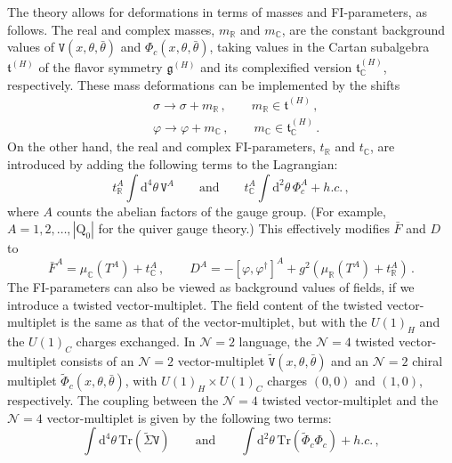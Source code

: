\documentclass[12pt,a4paper]{article}
\renewcommand{\(}{\left(}
\renewcommand{\)}{\right)}
\renewcommand{\(}{\left(}
\renewcommand{\)}{\right)}
\begin{document}
The theory allows for deformations in terms of masses and FI-parameters, as follows. 
The real and complex masses, $m_{\mathbb{R}}$ and $m_{\mathbb{C}}$, are the constant background values of $\mathtt{V}(x,\theta,\bar{\theta})$ and $\mathtt{\Phi}_c(x,\theta,\bar{\theta})$, taking values in the Cartan subalgebra $\mathfrak{t}^{(H)}$ of the flavor symmetry $\mathfrak{g}^{(H)}$ and its complexified version $\mathfrak{t}^{(H)}_{\mathbb{C}}$, respectively. 
These mass deformations can be implemented by the shifts 
\begin{equation}
\begin{aligned}
&\sigma\to\sigma+m_{\mathbb{R}}
\,,\qquad m_{\mathbb{R}}\in \mathfrak{t}^{(H)}\,,\\
&\varphi\to\varphi+m_{\mathbb{C}}\,,\qquad m_{\mathbb{C}}\in \mathfrak{t}^{(H)}_{\mathbb{C}}\,.
\end{aligned}
\end{equation}
On the other hand, the real and complex FI-parameters, $t_{\mathbb{R}}$ and $t_{\mathbb{C}}$, are introduced by adding the following terms to the Lagrangian:
\begin{equation}\label{eq:FI_para}
t^A_{\mathbb{R}}\int\mathrm{d}^4 \theta \, \mathtt{V}^A
\qquad \text{and}\qquad t^A_{\mathbb{C}}\int\mathrm{d}^2\theta \, \mathtt{\Phi}_c^A+h.c.\,,
\end{equation}
where $A$ counts the abelian factors of the gauge group. (For example, $A=1,2,\dots,|\mathrm{Q}_0|$ for the quiver gauge theory.) 
This effectively modifies $\bar{F}$ and $D$ to
\begin{equation}
\bar{F}^A= \mu_{\mathbb{C}}(T^A)+t^A_{\mathbb{C}}\,, \qquad
D^A= -[\varphi,\varphi^\dag]^A+g^2(\mu_{\mathbb{R}}(T^A)+t^A_{\mathbb{R}})\,.
\end{equation}
The FI-parameters can also be viewed as background values of fields, if we introduce a twisted vector-multiplet. 
The field content of the twisted vector-multiplet is the same as that of the vector-multiplet, but with the $U(1)_H$ and the $U(1)_C$ charges exchanged. 
In $\mathcal{N}=2$ language, the $\mathcal{N}=4$  twisted vector-multiplet consists of an $\mathcal{N}=2$ 
vector-multiplet $\tilde{\mathtt{V}}(x,\theta,\bar{\theta})$ and an $\mathcal{N}=2$ chiral multiplet $\tilde{\mathtt{\Phi}}_c(x,\theta,\bar{\theta})$, with $U(1)_H\times U(1)_C$ charges $(0,0)$ and $(1,0)$, respectively. 
The coupling between the  $\mathcal{N}=4$ twisted vector-multiplet and the $\mathcal{N}=4$ vector-multiplet is given by the following two terms:
\begin{equation}\label{eq:coupleTV-V}
\int \mathrm{d}^4\theta \,\mathrm{Tr}(\tilde{\mathtt{\Sigma}}\mathtt{V})
\qquad \text{and}\qquad 
\int \mathrm{d}^2\theta \, \mathrm{Tr}(\tilde{\mathtt{\Phi}}_c\mathtt{\Phi}_c)+h.c.\,,
\end{equation}
\end{document}
